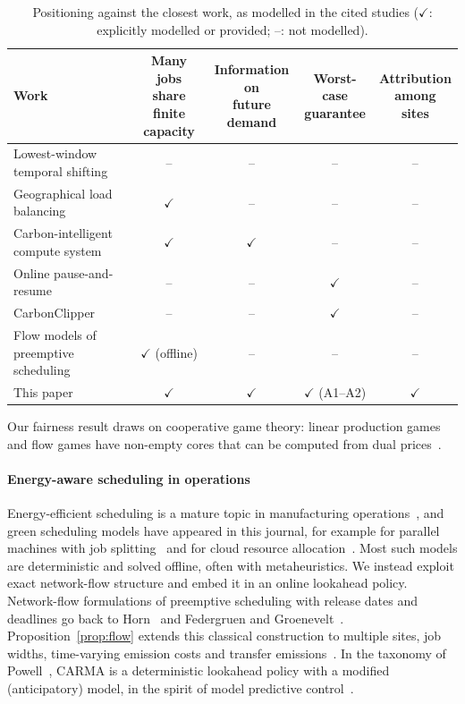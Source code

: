 \begin{table}[!htbp]
\centering
\caption{Positioning against the closest work, as modelled in the cited studies ($\checkmark$: explicitly modelled or provided; --: not modelled).}
\label{tab:related}
\footnotesize
\footnotesize\setlength{\tabcolsep}{3pt}
\begin{tabular}{p{4.3cm}cccc}
\toprule
Work & \makecell{Many jobs share\\finite capacity} & \makecell{Information on\\future demand} & \makecell{Worst-case\\guarantee} & \makecell{Attribution\\among sites} \\
\midrule
Lowest-window temporal shifting~\cite{wiesner2021lets} & -- & -- & -- & -- \\
Geographical load balancing~\cite{liu2011greening} & $\checkmark$ & -- & -- & -- \\
Carbon-intelligent compute system~\cite{radovanovic2023carbon} & $\checkmark$ & $\checkmark$ & -- & -- \\
Online pause-and-resume~\cite{lechowicz2023online} & -- & -- & $\checkmark$ & -- \\
CarbonClipper~\cite{lechowicz2025learning} & -- & -- & $\checkmark$ & -- \\
Flow models of preemptive scheduling~\cite{horn1974some,federgruen1986preemptive} & $\checkmark$ (offline) & -- & -- & -- \\
This paper & $\checkmark$ & $\checkmark$ & $\checkmark$ (A1--A2) & $\checkmark$ \\
\bottomrule
\end{tabular}
\end{table} Our fairness result draws on cooperative game theory: linear production games and flow games have non-empty cores that can be computed from dual prices~\cite{owen1975core,kalai1982totally}.

\paragraph{Energy-aware scheduling in operations} Energy-efficient scheduling is a mature topic in manufacturing operations~\cite{gahm2016energy}, and green scheduling models have appeared in this journal, for example for parallel machines with job splitting~\cite{asadpour2022green} and for cloud resource allocation~\cite{sharma2024efficient}. Most such models are deterministic and solved offline, often with metaheuristics. We instead exploit exact network-flow structure and embed it in an online lookahead policy. Network-flow formulations of preemptive scheduling with release dates and deadlines go back to Horn~\cite{horn1974some} and Federgruen and Groenevelt~\cite{federgruen1986preemptive}. Proposition~\ref{prop:flow} extends this classical construction to multiple sites, job widths, time-varying emission costs and transfer emissions~\cite{ahuja1993network,orlin1997polynomial}. In the taxonomy of Powell~\cite{powell2019unified}, CARMA is a deterministic lookahead policy with a modified (anticipatory) model, in the spirit of model predictive control~\cite{rawlings2017model,mayne2000constrained}.


